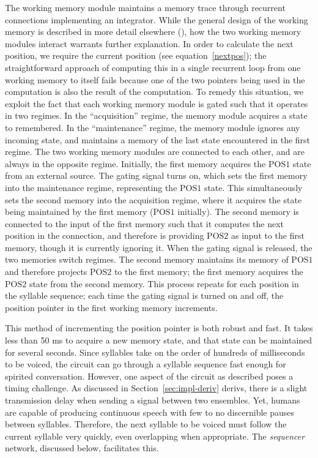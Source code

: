 The working memory module
maintains a memory trace
through recurrent connections
implementing an integrator.
While the general design of the working memory
is described in more detail elsewhere
(\cite{choo2010}),
how the two working memory modules
interact warrants further explanation.
In order to calculate the next position,
we require the current position
(see equation~\eqref{nextpos});
the straightforward approach
of computing this in a single recurrent loop
from one working memory to itself
fails because one of the two pointers
being used in the computation
is also the result of the computation.
To remedy this situation, we exploit the fact that
each working memory module is gated
such that it operates in two regimes.
In the ``acquisition'' regime,
the memory module acquires a state to remembered.
In the ``maintenance'' regime,
the memory module ignores any incoming state,
and maintains a memory of the last state
encountered in the first regime.
The two working memory modules
are connected to each other,
and are always in the opposite regime.
Initially, the first memory
acquires the $\text{POS1}$ state
from an external source.
The gating signal turns on,
which sets the first memory
into the maintenance regime,
representing the $\text{POS1}$ state.
This simultaneously sets the second memory
into the acquisition regime,
where it acquires the state
being maintained by the first memory
($\text{POS1}$ initially).
The second memory is connected
to the input of the first memory
such that it computes the
next position in the connection,
and therefore is providing
$\text{POS2}$ as input to the first memory,
though it is currently ignoring it.
When the gating signal is released,
the two memories switch regimes.
The second memory maintains
its memory of $\text{POS1}$
and therefore projects $\text{POS2}$
to the first memory;
the first memory acquires
the $\text{POS2}$ state from the second memory.
This process repeats for each position
in the syllable sequence;
each time the gating signal
is turned on and off,
the position pointer
in the first working memory increments.

This method of incrementing the position pointer
is both robust and fast.
It takes less than 50 ms to acquire
a new memory state,
and that state can be maintained
for several seconds.
Since syllables take
on the order of hundreds of milliseconds
to be voiced,
the circuit can go through a syllable sequence
fast enough for spirited conversation.
However, one aspect of the circuit as described
poses a timing challenge.
As discussed in Section~\ref{sec:impl-deriv} derivs,
there is a slight transmission delay
when sending a signal between two ensembles.
Yet, humans are capable of producing
continuous speech with
few to no discernible pauses between syllables.
Therefore, the next syllable to be voiced
must follow the current syllable very quickly,
even overlapping when appropriate.
The \textit{sequencer} network,
discussed below, facilitates this.

